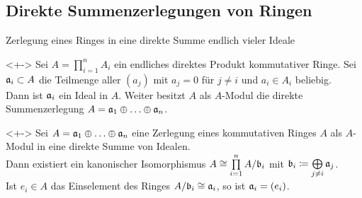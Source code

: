 \subsection{Direkte Summenzerlegungen von Ringen}

\begin{frame}{Zerlegung eines Ringes in eine direkte Summe endlich vieler Ideale}
	\begin{example}<+->
		Sei \(A = \prod\limits_{i = 1}^n A_i\) ein endliches direktes Produkt kommutativer Ringe. Sei
		\(\mathfrak{a}_i \subset A\) die Teilmenge aller \((a_j)\) mit \(a_j = 0\) für \(j \neq i\) und
		\(a_i \in A_i\) beliebig.
		\\
		Dann ist \(\mathfrak{a}_i\) ein Ideal in \(A\). Weiter besitzt \(A\) als \(A\)-Modul die direkte
		Summenzerlegung \(A = \mathfrak{a}_1 \oplus \dotsc \oplus \mathfrak{a}_n\).
	\end{example}
	\begin{example}<+->
		Sei \(A = \mathfrak{a}_1 \oplus \dotsc \oplus \mathfrak{a}_n\) eine Zerlegung eines kommutativen Ringes \(A\)
		als \(A\)-Modul in eine direkte Summe von Idealen.
		\\
		Dann existiert ein kanonischer Isomorphismus \(A \cong \prod\limits_{i = 1}^n A/\mathfrak{b}_i\)
		mit \(\mathfrak{b}_i \coloneqq \bigoplus\limits_{j \neq i} \mathfrak{a}_j\). 
		\\
		Ist \(e_i \in A\) das Einselement des Ringes \(A/\mathfrak{b}_i \cong \mathfrak{a}_i\), so ist
		\(\mathfrak{a}_i = (e_i)\).
	\end{example}
\end{frame}

